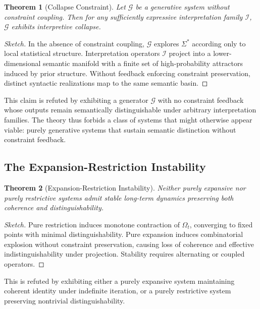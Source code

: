 \documentclass[12pt, a4paper]{article}
\theoremstyle{plain}
\newtheorem{theorem}{Theorem}[section]
\theoremstyle{definition}
\theoremstyle{remark}
\begin{document}
\begin{theorem}[Collapse Constraint]
Let $\mathcal{G}$ be a generative system without constraint coupling. Then for any sufficiently expressive interpretation family $\mathcal{I}$, $\mathcal{G}$ exhibits interpretive collapse.
\end{theorem}

\begin{proof}[Sketch]
In the absence of constraint coupling, $\mathcal{G}$ explores $\Sigma^*$ according only to local statistical structure. Interpretation operators $\mathcal{I}$ project into a lower-dimensional semantic manifold with a finite set of high-probability attractors induced by prior structure. Without feedback enforcing constraint preservation, distinct syntactic realizations map to the same semantic basin.
\end{proof}

This claim is refuted by exhibiting a generator $\mathcal{G}$ with no constraint feedback whose outputs remain semantically distinguishable under arbitrary interpretation families. The theory thus forbids a class of systems that might otherwise appear viable: purely generative systems that sustain semantic distinction without constraint feedback.

\subsection{The Expansion-Restriction Instability}

\begin{theorem}[Expansion-Restriction Instability]
Neither purely expansive nor purely restrictive systems admit stable long-term dynamics preserving both coherence and distinguishability.
\end{theorem}

\begin{proof}[Sketch]
Pure restriction induces monotone contraction of $\Omega_t$, converging to fixed points with minimal distinguishability. Pure expansion induces combinatorial explosion without constraint preservation, causing loss of coherence and effective indistinguishability under projection. Stability requires alternating or coupled operators.
\end{proof}

This is refuted by exhibiting either a purely expansive system maintaining coherent identity under indefinite iteration, or a purely restrictive system preserving nontrivial distinguishability.
\end{document}
